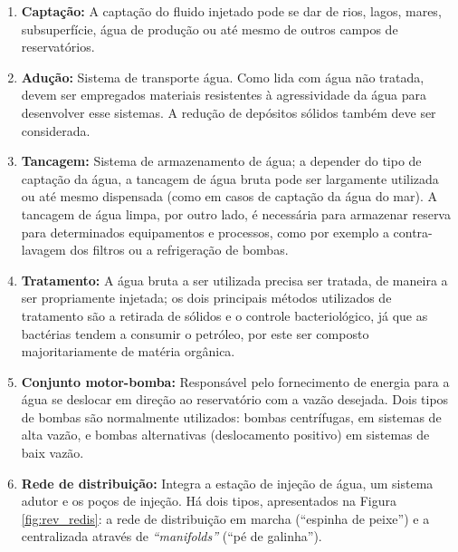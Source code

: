 \begin{enumerate}
\item \textbf{Capta\c{c}\~{a}o:} A capta\c{c}\~{a}o do fluido injetado pode se dar de rios, lagos, mares, subsuperf\'{i}cie, \'{a}gua de produ\c{c}\~{a}o ou at\'{e} mesmo de outros campos de reservat\'{o}rios.

\item \textbf{Adu\c{c}\~{a}o:} Sistema de transporte \'{a}gua. Como lida com \'{a}gua n\~{a}o tratada, devem ser empregados materiais resistentes \`{a} agressividade da \'{a}gua para desenvolver esse sistemas. A redu\c{c}\~{a}o de dep\'{o}sitos s\'{o}lidos tamb\'{e}m deve ser considerada.

\item \textbf{Tancagem:} Sistema de armazenamento de \'{a}gua; a depender do tipo de capta\c{c}\~{a}o da \'{a}gua, a tancagem de \'{a}gua bruta pode ser largamente utilizada ou at\'{e} mesmo dispensada (como em casos de capta\c{c}\~{a}o da \'{a}gua do mar). A tancagem de \'{a}gua limpa, por outro lado, \'{e} necess\'{a}ria para armazenar reserva para determinados equipamentos e processos, como por exemplo a contra-lavagem dos filtros ou a refrigera\c{c}\~{a}o de bombas.

\item \textbf{Tratamento:} A \'{a}gua bruta a ser utilizada precisa ser tratada, de maneira a ser propriamente injetada; os dois principais m\'{e}todos utilizados de tratamento s\~{a}o a retirada de s\'{o}lidos e o controle bacteriol\'{o}gico, j\'{a} que as bact\'{e}rias tendem a consumir o petr\'{o}leo, por este ser composto majoritariamente de mat\'{e}ria org\^{a}nica.

\item \textbf{Conjunto motor-bomba:} Respons\'{a}vel pelo fornecimento de energia para a \'{a}gua se deslocar em dire\c{c}\~{a}o ao reservat\'{o}rio com a vaz\~{a}o desejada. Dois tipos de bombas s\~{a}o normalmente utilizados: bombas centr\'{i}fugas, em sistemas de alta vaz\~{a}o, e bombas alternativas (deslocamento positivo) em sistemas de baix vaz\~{a}o.

\item \textbf{Rede de distribui\c{c}\~{a}o:} Integra a esta\c{c}\~{a}o de inje\c{c}\~{a}o de \'{a}gua, um sistema adutor e os po\c{c}os de inje\c{c}\~{a}o. H\'{a} dois tipos, apresentados na Figura \ref{fig:rev_redis}: a rede de distribui\c{c}\~{a}o em marcha (``espinha de peixe'') e a centralizada atrav\'{e}s de \textit{``manifolds''} (``p\'{e} de galinha'').


\end{enumerate}
